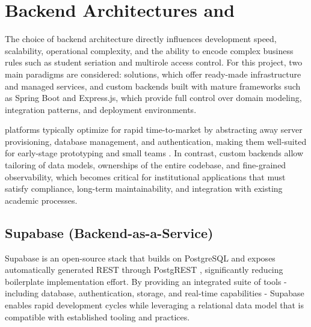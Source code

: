 \section{Backend Architectures and }
\label{sec:sota_backend}
\ntindex[Template]{}
    {
        The choice of backend architecture directly influences development speed, scalability, operational complexity, and the ability to encode complex business 
        rules such as student seriation and multirole access control. For this project, two main paradigms are considered:  solutions, 
        which offer ready-made infrastructure and managed services, and custom backends built with mature frameworks such as Spring Boot and Express.js, 
        which provide full control over domain modeling, integration patterns, and deployment environments. \cite{lertaul-2014-ebaas, dbapi-2025-baas-platform}
    }

    {
         platforms typically optimize for rapid time-to-market by abstracting away server provisioning, database management, and authentication, making them well-suited 
        for early-stage prototyping and small teams \cite{dbapi-2025-baas-platform}. In contrast, custom backends allow tailoring of data models, ownerships of the entire codebase, and fine-grained observability, 
        which becomes critical for institutional applications that must satisfy compliance, long-term maintainability, and integration with existing academic processes.
    }

    

    \subsection{Supabase (Backend-as-a-Service)}
        {
            Supabase is an open-source  stack that builds on PostgreSQL and exposes automatically generated REST  through PostgREST \cite{supabase-rest-api-overview}, significantly reducing 
            boilerplate  implementation effort. By providing an integrated suite of tools - including database, authentication, storage, and real-time capabilities - 
            Supabase enables rapid development cycles while leveraging a relational data model that is compatible with established  tooling and practices. \cite{supabase-2019}
        }

